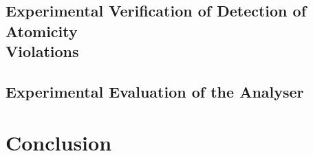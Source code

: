 

\section[%
    Experimental Verification of Detection of Atomicity Violations%
]{Experimental Verification of Detection of Atomicity \\ Violations}
\label{sec:experimentsPhase2}



\section{Experimental Evaluation of the Analyser}
\label{sec:experiments}




\chapter{Conclusion}
\label{chap:conclusion}



